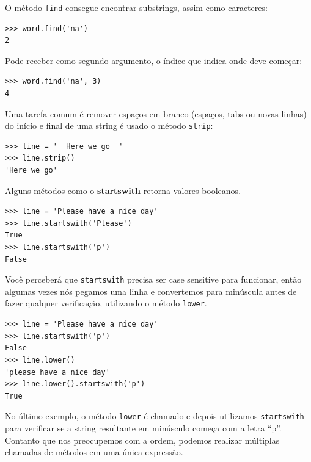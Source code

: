 {O método {\tt find} consegue encontrar substrings, assim como caracteres:

\beforeverb
\begin{verbatim}
>>> word.find('na')
2
\end{verbatim}
\afterverb
%
%
Pode receber como segundo argumento, o índice que indica onde deve começar:


\beforeverb
\begin{verbatim}
>>> word.find('na', 3)
4
\end{verbatim}
\afterverb
%
%
Uma tarefa comum é remover espaços em branco (espaços, tabs ou novas
linhas) do início e final de uma string é usado o método {\tt strip}:

\beforeverb
\begin{verbatim}
>>> line = '  Here we go  '
>>> line.strip()
'Here we go'
\end{verbatim}
\afterverb
%
%
Alguns métodos como o {\bf startswith} retorna valores booleanos.

\beforeverb
\begin{verbatim}
>>> line = 'Please have a nice day'
>>> line.startswith('Please')
True
>>> line.startswith('p')
False
\end{verbatim}
\afterverb
%
%
Você perceberá que {\tt startswith} precisa ser case sensitive para funcionar, 
então algumas vezes nós pegamos uma linha e convertemos para minúscula antes 
de fazer qualquer verificação, utilizando o método {\tt lower}.

\beforeverb
\begin{verbatim}
>>> line = 'Please have a nice day'
>>> line.startswith('p')
False
>>> line.lower()
'please have a nice day'
>>> line.lower().startswith('p')
True
\end{verbatim}
\afterverb
%
%
No último exemplo, o método {\tt lower} é chamado e depois utilizamos
{\tt startswith} para verificar se a string resultante em minúsculo começa
com a letra ``p''. Contanto que nos preocupemos com a ordem, podemos realizar
múltiplas chamadas de métodos em uma única expressão.

}
